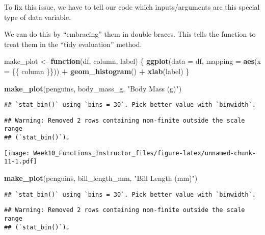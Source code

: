 \documentclass[
]{article}
\newenvironment{Shaded}{\begin{snugshade}}{\end{snugshade}}
\newcommand{\AttributeTok}[1]{\textcolor[rgb]{0.13,0.29,0.53}{#1}}
\newcommand{\ControlFlowTok}[1]{\textcolor[rgb]{0.13,0.29,0.53}{\textbf{#1}}}
\newcommand{\FunctionTok}[1]{\textcolor[rgb]{0.13,0.29,0.53}{\textbf{#1}}}
\newcommand{\NormalTok}[1]{#1}
\newcommand{\OtherTok}[1]{\textcolor[rgb]{0.56,0.35,0.01}{#1}}
\newcommand{\SpecialCharTok}[1]{\textcolor[rgb]{0.81,0.36,0.00}{\textbf{#1}}}
\newcommand{\StringTok}[1]{\textcolor[rgb]{0.31,0.60,0.02}{#1}}
\begin{document}
To fix this issue, we have to tell our code which inputs/arguments are
this special type of data variable.

We can do this by ``embracing'' them in double braces. This tells the
function to treat them in the ``tidy evaluation'' method.

\begin{Shaded}
\begin{Highlighting}[]
\NormalTok{make\_plot }\OtherTok{\textless{}{-}} \ControlFlowTok{function}\NormalTok{(df, column, label) \{}
    \FunctionTok{ggplot}\NormalTok{(}\AttributeTok{data =}\NormalTok{ df, }\AttributeTok{mapping =} \FunctionTok{aes}\NormalTok{(}\AttributeTok{x =}\NormalTok{ \{\{ column \}\})) }\SpecialCharTok{+}
    \FunctionTok{geom\_histogram}\NormalTok{() }\SpecialCharTok{+}
    \FunctionTok{xlab}\NormalTok{(label)}
\NormalTok{\}}

\FunctionTok{make\_plot}\NormalTok{(penguins, body\_mass\_g, }\StringTok{"Body Mass (g)"}\NormalTok{)}
\end{Highlighting}
\end{Shaded}

\begin{verbatim}
## `stat_bin()` using `bins = 30`. Pick better value with `binwidth`.
\end{verbatim}

\begin{verbatim}
## Warning: Removed 2 rows containing non-finite outside the scale range
## (`stat_bin()`).
\end{verbatim}

\texttt{[image: Week10\_Functions\_Instructor\_files/figure-latex/unnamed-chunk-11-1.pdf]}

\begin{Shaded}
\begin{Highlighting}[]
\FunctionTok{make\_plot}\NormalTok{(penguins, bill\_length\_mm, }\StringTok{"Bill Length (mm)"}\NormalTok{)}
\end{Highlighting}
\end{Shaded}

\begin{verbatim}
## `stat_bin()` using `bins = 30`. Pick better value with `binwidth`.
\end{verbatim}

\begin{verbatim}
## Warning: Removed 2 rows containing non-finite outside the scale range
## (`stat_bin()`).
\end{verbatim}
\end{document}
